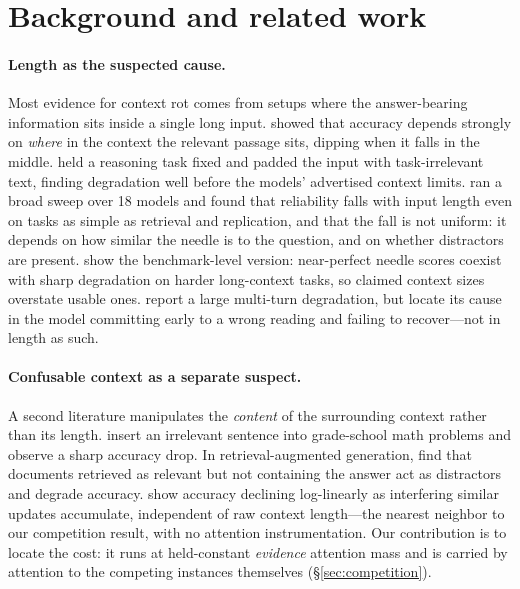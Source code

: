 \documentclass{article}
\begin{document}
\appendix
\normalsize

\section{Background and related work}
\label{app:related}

\paragraph{Length as the suspected cause.}
Most evidence for context rot comes from setups where the answer-bearing information sits inside
a single long input. \citet{liu2023lost} showed that accuracy depends strongly on \emph{where} in
the context the relevant passage sits, dipping when it falls in the middle. \citet{levy2024same}
held a reasoning task fixed and padded the input with task-irrelevant text, finding degradation
well before the models' advertised context limits. \citet{hong2025contextrot} ran a broad sweep
over 18 models and found that reliability falls with input length even on tasks as simple as
retrieval and replication, and that the fall is not uniform: it depends on how similar the needle
is to the question, and on whether distractors are present. \citet{hsieh2024ruler} show the
benchmark-level version: near-perfect needle scores coexist with sharp degradation on harder
long-context tasks, so claimed context sizes overstate usable ones. \citet{laban2025lost} report a large
multi-turn degradation, but locate its cause in the model committing early to a wrong reading and
failing to recover---not in length as such.

\paragraph{Confusable context as a separate suspect.}
A second literature manipulates the \emph{content} of the surrounding context rather than its
length. \citet{shi2023distracted} insert an irrelevant sentence into grade-school math problems
and observe a sharp accuracy drop. In retrieval-augmented generation, \citet{cuconasu2024noise}
find that documents retrieved as relevant but not containing the answer act as distractors and
degrade accuracy. \citet{wang2025unabletoforget} show accuracy declining log-linearly as
interfering similar updates accumulate, independent of raw context length---the nearest neighbor
to our competition result, with no attention instrumentation. Our contribution is to locate the
cost: it runs at held-constant \emph{evidence} attention mass and is carried by attention to the
competing instances themselves (\S\ref{sec:competition}).
\end{document}
